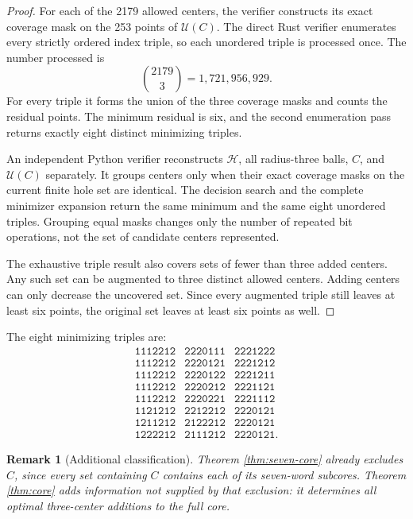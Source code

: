 \documentclass[11pt]{article}
\newtheorem{remark}[theorem]{Remark}
\newcommand{\Hspace}{\mathcal{H}}
\newcommand{\Uncov}{\mathcal{U}}
\newcommand{\codeword}[1]{\texttt{#1}}
\begin{document}
\begin{proof}
For each of the 2179 allowed centers, the verifier constructs its exact
coverage mask on the 253 points of \(\Uncov(C)\).  The direct Rust
verifier enumerates every strictly ordered index triple, so each
unordered triple is processed once.  The number processed is
\[
  \binom{2179}{3}=1{,}721{,}956{,}929.
\]
For every triple it forms the union of the three coverage masks and
counts the residual points.  The minimum residual is six, and the second
enumeration pass returns exactly eight distinct minimizing triples.

An independent Python verifier reconstructs \(\Hspace\), all radius-three
balls, \(C\), and \(\Uncov(C)\) separately.  It groups centers only when
their exact coverage masks on the current finite hole set are identical.
The decision search and the complete minimizer expansion return the same
minimum and the same eight unordered triples.  Grouping equal masks
changes only the number of repeated bit operations, not the set of
candidate centers represented.

The exhaustive triple result also covers sets of fewer than three added
centers.  Any such set can be augmented to three distinct allowed
centers.  Adding centers can only decrease the uncovered set.  Since
every augmented triple still leaves at least six points, the original
set leaves at least six points as well.
\end{proof}

The eight minimizing triples are:
\[
\begin{array}{lll}
\codeword{1112212} & \codeword{2220111} & \codeword{2221222}\\
\codeword{1112212} & \codeword{2220121} & \codeword{2221212}\\
\codeword{1112212} & \codeword{2220122} & \codeword{2221211}\\
\codeword{1112212} & \codeword{2220212} & \codeword{2221121}\\
\codeword{1112212} & \codeword{2220221} & \codeword{2221112}\\
\codeword{1121212} & \codeword{2212212} & \codeword{2220121}\\
\codeword{1211212} & \codeword{2122212} & \codeword{2220121}\\
\codeword{1222212} & \codeword{2111212} & \codeword{2220121}.
\end{array}
\]

\begin{remark}[Additional classification]
Theorem \ref{thm:seven-core} already excludes \(C\), since every set
containing \(C\) contains each of its seven-word subcores.  Theorem
\ref{thm:core} adds information not supplied by that exclusion: it
determines all optimal three-center additions to the full core.
\end{remark}
\end{document}
